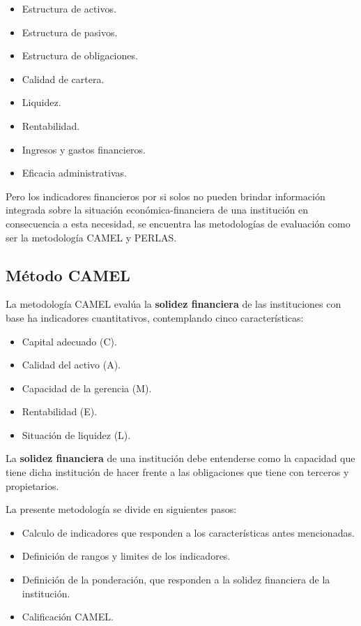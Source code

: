 \documentclass[
  12pt,
]{article}
\providecommand{\tightlist}{%
  \setlength{\itemsep}{0pt}\setlength{\parskip}{0pt}}
\begin{document}
\begin{itemize}
\tightlist
\item
  Estructura de activos.
\item
  Estructura de pasivos.
\item
  Estructura de obligaciones.
\item
  Calidad de cartera.
\item
  Liquidez.
\item
  Rentabilidad.
\item
  Ingresos y gastos financieros.
\item
  Eficacia administrativas.
\end{itemize}

Pero los indicadores financieros por si solos no pueden brindar
información integrada sobre la situación económica-financiera de una
institución en consecuencia a esta necesidad, se encuentra las
metodologías de evaluación como ser la metodología CAMEL y PERLAS.

\hypertarget{muxe9todo-camel}{%
\subsection{Método CAMEL}\label{muxe9todo-camel}}

La metodología CAMEL evalúa la \textbf{solidez financiera} de las
instituciones con base ha indicadores cuantitativos, contemplando cinco
características:

\begin{itemize}
\tightlist
\item
  Capital adecuado (C).
\item
  Calidad del activo (A).
\item
  Capacidad de la gerencia (M).
\item
  Rentabilidad (E).
\item
  Situación de liquidez (L).
\end{itemize}

La \textbf{solidez financiera} de una institución debe entenderse como
la capacidad que tiene dicha institución de hacer frente a las
obligaciones que tiene con terceros y propietarios.

La presente metodología se divide en siguientes pasos:

\begin{itemize}
\tightlist
\item
  Calculo de indicadores que responden a los características antes
  mencionadas.
\item
  Definición de rangos y limites de los indicadores.
\item
  Definición de la ponderación, que responden a la solidez financiera de
  la institución.
\item
  Calificación CAMEL.
\end{itemize}
\end{document}
